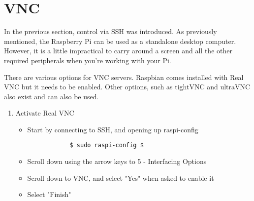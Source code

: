 \section{VNC}
\label{app:Services-VNC}
In the previous section, control via SSH was introduced. As previously mentioned, the Raspberry Pi can be used as a standalone desktop computer. However, it is a little impractical to carry around a screen and all the other required peripherals when you're working with your Pi. 

There are various options for VNC servers. Raspbian comes installed with Real VNC but it needs to be enabled. Other options, such as tightVNC and ultraVNC also exist and can also be used. 

\begin{enumerate}
    \item Activate Real VNC\\
        \begin{itemize}
            \item Start by connecting to SSH, and opening up raspi-config
        \begin{verbatim}
            $ sudo raspi-config $
        \end{verbatim}
        \item Scroll down using the arrow keys to 5 - Interfacing Options
        \item Scroll down to VNC, and select "Yes" when asked to enable it
        \item Select "Finish"
    \end{itemize}
    

\end{enumerate}
